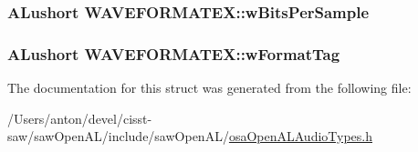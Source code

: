 \subsubsection[{w\+Bits\+Per\+Sample}]{\setlength{\rightskip}{0pt plus 5cm}A\+Lushort W\+A\+V\+E\+F\+O\+R\+M\+A\+T\+E\+X\+::w\+Bits\+Per\+Sample}\label{struct_w_a_v_e_f_o_r_m_a_t_e_x_a7131210349a03e87c94d2f08a1530002}
\hypertarget{struct_w_a_v_e_f_o_r_m_a_t_e_x_ae64cc7e3612e90153b9c85278e819661}{}
\subsubsection[{w\+Format\+Tag}]{\setlength{\rightskip}{0pt plus 5cm}A\+Lushort W\+A\+V\+E\+F\+O\+R\+M\+A\+T\+E\+X\+::w\+Format\+Tag}\label{struct_w_a_v_e_f_o_r_m_a_t_e_x_ae64cc7e3612e90153b9c85278e819661}


The documentation for this struct was generated from the following file\+:\begin{DoxyCompactItemize}
\item 
/\+Users/anton/devel/cisst-\/saw/saw\+Open\+A\+L/include/saw\+Open\+A\+L/\hyperlink{osa_open_a_l_audio_types_8h}{osa\+Open\+A\+L\+Audio\+Types.\+h}\end{DoxyCompactItemize}
